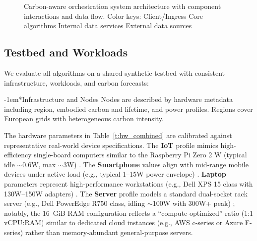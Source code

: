 \documentclass[10pt,journal,compsoc]{IEEEtran}
\makeatletter
\renewcommand{\paragraph}{\@startsection{paragraph}{4}{0pt}{1.5ex plus 1.5ex minus 0.5ex}%
{-1em}{\normalfont\normalsize\bfseries}}
\makeatother
\begin{document}
\begin{figure}[htbp]
\caption{Carbon-aware orchestration system architecture with component interactions and data flow.
\footnotesize{Color keys:}\; Client/Ingress\; Core algorithms\; Internal data services\; External data sources}
\label{f:arch}
\end{figure}

\subsection{Testbed and Workloads}\label{s:testbed}  %

We evaluate all algorithms on a shared synthetic testbed with consistent infrastructure, workloads, and carbon forecasts:

\paragraph*{Infrastructure and Nodes} Nodes are described by hardware metadata including region, embodied carbon and lifetime, and power profiles. Regions cover European grids with heterogeneous carbon intensity.

The hardware parameters in Table~\ref{t:hw_combined} are calibrated against representative real-world device specifications. The \textbf{IoT} profile mimics high-efficiency single-board computers similar to the Raspberry Pi Zero 2 W (typical idle $\sim$0.6W, max $\sim$3W) \cite{rpi_zero2w_product_brief}. The \textbf{Smartphone} values align with mid-range mobile devices under active load (e.g., typical 1--15W power envelope) \cite{samsung_s24_spec}. \textbf{Laptop} parameters represent high-performance workstations (e.g., Dell XPS 15 class with 130W--150W adapters) \cite{dell_xps15_spec}. The \textbf{Server} profile models a standard dual-socket rack server (e.g., Dell PowerEdge R750 class, idling $\sim$100W with 300W+ peak) \cite{dell_r750_spec}; notably, the 16~GiB RAM configuration reflects a ``compute-optimized'' ratio (1:1 vCPU:RAM) similar to dedicated cloud instances (e.g., AWS c-series \cite{aws_c7g} or Azure F-series) rather than memory-abundant general-purpose servers.
\end{document}
